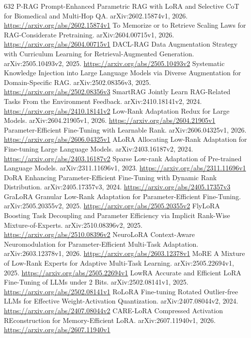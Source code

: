 \documentclass[11pt]{article}
\begin{document}
\begin{thebibliography}{632}
 P-RAG Prompt-Enhanced Parametric RAG with LoRA and Selective CoT for Biomedical and Multi-Hop QA. arXiv:2602.15874v1, 2026. \url{https://arxiv.org/abs/2602.15874v1}
 To Memorize or to Retrieve Scaling Laws for RAG-Considerate Pretraining. arXiv:2604.00715v1, 2026. \url{https://arxiv.org/abs/2604.00715v1}
 DACL-RAG Data Augmentation Strategy with Curriculum Learning for Retrieval-Augmented Generation. arXiv:2505.10493v2, 2025. \url{https://arxiv.org/abs/2505.10493v2}
 Systematic Knowledge Injection into Large Language Models via Diverse Augmentation for Domain-Specific RAG. arXiv:2502.08356v3, 2025. \url{https://arxiv.org/abs/2502.08356v3}
 SmartRAG Jointly Learn RAG-Related Tasks From the Environment Feedback. arXiv:2410.18141v2, 2024. \url{https://arxiv.org/abs/2410.18141v2}
 Low-Rank Adaptation Redux for Large Models. arXiv:2604.21905v1, 2026. \url{https://arxiv.org/abs/2604.21905v1}
 Parameter-Efficient Fine-Tuning with Learnable Rank. arXiv:2606.04325v1, 2026. \url{https://arxiv.org/abs/2606.04325v1}
 ALoRA Allocating Low-Rank Adaptation for Fine-tuning Large Language Models. arXiv:2403.16187v2, 2024. \url{https://arxiv.org/abs/2403.16187v2}
 Sparse Low-rank Adaptation of Pre-trained Language Models. arXiv:2311.11696v1, 2023. \url{https://arxiv.org/abs/2311.11696v1}
 DoRA Enhancing Parameter-Efficient Fine-Tuning with Dynamic Rank Distribution. arXiv:2405.17357v3, 2024. \url{https://arxiv.org/abs/2405.17357v3}
 GraLoRA Granular Low-Rank Adaptation for Parameter-Efficient Fine-Tuning. arXiv:2505.20355v2, 2025. \url{https://arxiv.org/abs/2505.20355v2}
 FlyLoRA Boosting Task Decoupling and Parameter Efficiency via Implicit Rank-Wise Mixture-of-Experts. arXiv:2510.08396v2, 2025. \url{https://arxiv.org/abs/2510.08396v2}
 NeuroLoRA Context-Aware Neuromodulation for Parameter-Efficient Multi-Task Adaptation. arXiv:2603.12378v1, 2026. \url{https://arxiv.org/abs/2603.12378v1}
 MoRE A Mixture of Low-Rank Experts for Adaptive Multi-Task Learning. arXiv:2505.22694v1, 2025. \url{https://arxiv.org/abs/2505.22694v1}
 LowRA Accurate and Efficient LoRA Fine-Tuning of LLMs under 2 Bits. arXiv:2502.08141v1, 2025. \url{https://arxiv.org/abs/2502.08141v1}
 RoLoRA Fine-tuning Rotated Outlier-free LLMs for Effective Weight-Activation Quantization. arXiv:2407.08044v2, 2024. \url{https://arxiv.org/abs/2407.08044v2}
 CARE-LoRA Compressed Activation REconstruction for Memory-Efficient LoRA. arXiv:2607.11940v1, 2026. \url{https://arxiv.org/abs/2607.11940v1}

\end{thebibliography}
\end{document}
